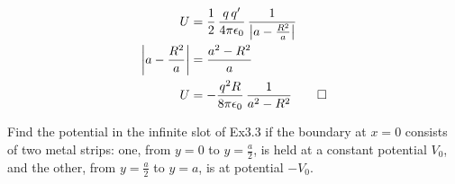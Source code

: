 \begin{hwkProblem}{3.8}{}
	\hwkPart{}

	\begin{align*}
		U&=\frac{1}{2}\,\frac{q\,q'}{4\pi\epsilon_0}\,\frac{1}{\left|a-\frac{R^2}{a}\right|} \\
		\left|a-\frac{R^2}{a}\right|&=\frac{a^2-R^2}{a} \\
		U&=-\frac{q^2R}{8\pi\epsilon_0}\,\frac{1}{a^2-R^2} \qed
	\end{align*}

\end{hwkProblem}
\begin{hwkProblem}{3.13}{}
	
	Find the potential in the infinite slot of Ex3.3 if the boundary at \( x = 0 \) consists of two metal strips: one, from \( y = 0 \) to \( y = \frac{a}{2} \), is held at a constant potential \( V_{0} \), and the other, from \( y = \frac{a}{2} \) to \( y = a \), is at potential \( -V_{0} \).

	\hwkSol{}


\end{hwkProblem}
